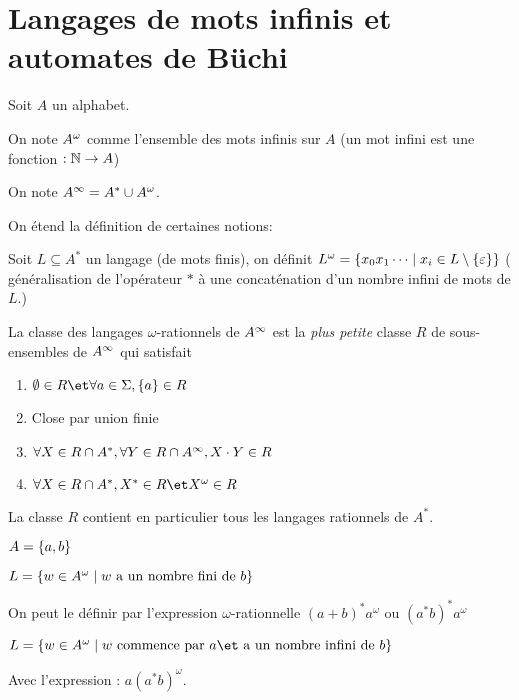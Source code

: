 \section{Langages de mots infinis et automates de Büchi}

\begin{notation}
	Soit $A$ un alphabet.

	On note $A^{\omega}$ comme l'ensemble des mots infinis sur $A$
	(un mot infini est une fonction $: \mathbb{N} \to A$)

	On note $A^{\infty} = A^* \cup A^{\omega}$.

	On étend la définition de certaines notions:

	Soit $L \subseteq A^*$ un langage (de mots finis), on définit
	$L^{\omega} = \left\{x_0x_1\cdots \mid x_i \in L \setminus \left\{\varepsilon\right\}\right\}$
	( généralisation de l'opérateur $*$ à une concaténation d'un nombre infini de mots de $L$.)
\end{notation}


\begin{definition}
	La classe des langages $\omega$-rationnels de $A^{\infty}$ est la \emph{plus petite}
	classe $R$ de sous-ensembles de $A^{\infty}$ qui satisfait
	\begin{enumerate}
		\item $\emptyset \in R \et \forall a \in \Sigma, \set a \in R$
		\item Close par union finie
		\item $\forall X \in R \cap A^*, \forall Y \in R \cap A^{\infty}, X \cdot Y \in R$ \label{omega-clot-fi}
		\item $\forall X \in R \cap A^*, X^* \in R \et X^{\omega} \in R$\label{omega-clot-op}
	\end{enumerate}
\end{definition}

\begin{remarque}
	La classe $R$ contient en particulier tous les langages rationnels de $A^*$.
\end{remarque}

\begin{exemple}
	$A = \left\{a,b\right\}$

	$L = \left\{w \in A^{\omega} \mid w \text{ a un nombre fini de } b\right\}$

	On peut le définir par l'expression $\omega$-rationnelle $(a + b)^* a^{\omega}$ ou $(a^*b)^* a^{\omega}$


	$L = \setdef {w \in \aomega} {w \text{ commence par } a \et \text{ a un nombre infini de } b}$

	Avec l'expression : $a(a^*b)^{\omega}$.
\end{exemple}

